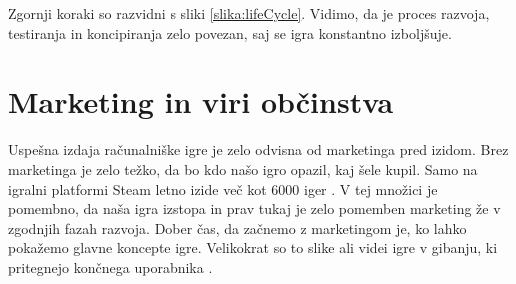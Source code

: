 \documentclass[12pt,a4paper,twoside]{book}
\begin{document}
Zgornji koraki so razvidni s sliki \ref{slika:lifeCycle}. Vidimo, da je proces razvoja, testiranja in koncipiranja zelo povezan, saj se igra konstantno izboljšuje.

\section{Marketing in viri občinstva}
Uspešna izdaja računalniške igre je zelo odvisna od marketinga pred izidom. Brez marketinga je zelo težko, da bo kdo našo igro opazil, kaj šele kupil. Samo na igralni platformi Steam letno izide več kot 6000 iger \cite{james6000Games}. V tej množici je pomembno, da naša igra izstopa in prav tukaj je zelo pomemben marketing že v zgodnjih fazah razvoja. Dober čas, da začnemo z marketingom je, ko lahko pokažemo glavne koncepte igre. Velikokrat so to slike ali videi igre v gibanju, ki pritegnejo končnega uporabnika \cite{robertMarketing}.
\end{document}
